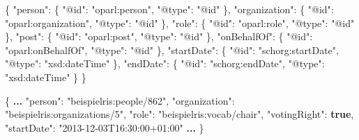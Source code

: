 \documentclass[,a4paper]{article}
\newenvironment{Shaded}{}{}
\newcommand{\KeywordTok}[1]{\textcolor[rgb]{0.00,0.44,0.13}{\textbf{{#1}}}}
\newcommand{\DataTypeTok}[1]{\textcolor[rgb]{0.56,0.13,0.00}{{#1}}}
\newcommand{\StringTok}[1]{\textcolor[rgb]{0.25,0.44,0.63}{{#1}}}
\newcommand{\FunctionTok}[1]{\textcolor[rgb]{0.02,0.16,0.49}{{#1}}}
\newcommand{\ErrorTok}[1]{\textcolor[rgb]{1.00,0.00,0.00}{\textbf{{#1}}}}
\begin{document}
\begin{Shaded}
\begin{Highlighting}[]
\FunctionTok{\{}
    \DataTypeTok{"person"}\FunctionTok{:} \FunctionTok{\{}
        \DataTypeTok{"@id"}\FunctionTok{:} \StringTok{"oparl:person"}\FunctionTok{,}
        \DataTypeTok{"@type"}\FunctionTok{:} \StringTok{"@id"}
    \FunctionTok{\},}
    \DataTypeTok{"organization"}\FunctionTok{:} \FunctionTok{\{}
        \DataTypeTok{"@id"}\FunctionTok{:} \StringTok{"oparl:organization"}\FunctionTok{,}
        \DataTypeTok{"@type"}\FunctionTok{:} \StringTok{"@id"}
    \FunctionTok{\},}
    \DataTypeTok{"role"}\FunctionTok{:} \FunctionTok{\{}
        \DataTypeTok{"@id"}\FunctionTok{:} \StringTok{"oparl:role"}\FunctionTok{,}
        \DataTypeTok{"@type"}\FunctionTok{:} \StringTok{"@id"}
    \FunctionTok{\},}
    \DataTypeTok{"post"}\FunctionTok{:} \FunctionTok{\{}
        \DataTypeTok{"@id"}\FunctionTok{:} \StringTok{"oparl:post"}\FunctionTok{,}
        \DataTypeTok{"@type"}\FunctionTok{:} \StringTok{"@id"}
    \FunctionTok{\},}  
    \DataTypeTok{"onBehalfOf"}\FunctionTok{:} \FunctionTok{\{}
        \DataTypeTok{"@id"}\FunctionTok{:} \StringTok{"oparl:onBehalfOf"}\FunctionTok{,}
        \DataTypeTok{"@type"}\FunctionTok{:} \StringTok{"@id"}
    \FunctionTok{\},}
    \DataTypeTok{"startDate"}\FunctionTok{:} \FunctionTok{\{}
        \DataTypeTok{"@id"}\FunctionTok{:} \StringTok{"schorg:startDate"}\FunctionTok{,}
        \DataTypeTok{"@type"}\FunctionTok{:} \StringTok{"xsd:dateTime"}
    \FunctionTok{\},}
    \DataTypeTok{"endDate"}\FunctionTok{:} \FunctionTok{\{}
        \DataTypeTok{"@id"}\FunctionTok{:} \StringTok{"schorg:endDate"}\FunctionTok{,}
        \DataTypeTok{"@type"}\FunctionTok{:} \StringTok{"xsd:dateTime"}
    \FunctionTok{\}}
\FunctionTok{\}}
\end{Highlighting}
\end{Shaded}

\begin{Shaded}
\begin{Highlighting}[]
\FunctionTok{\{}
\ErrorTok{...}
    \DataTypeTok{"person"}\FunctionTok{:} \StringTok{"beispielris:people/862"}\FunctionTok{,}
    \DataTypeTok{"organization"}\FunctionTok{:} \StringTok{"beispielris:organizations/5"}\FunctionTok{,}
    \DataTypeTok{"role"}\FunctionTok{:} \StringTok{"beispielris:vocab/chair"}\FunctionTok{,}
    \DataTypeTok{"votingRight"}\FunctionTok{:} \KeywordTok{true}\FunctionTok{,}
    \DataTypeTok{"startDate"}\FunctionTok{:} \StringTok{"2013-12-03T16:30:00+01:00"}
\ErrorTok{...}
\FunctionTok{\}}
\end{Highlighting}
\end{Shaded}
\end{document}
